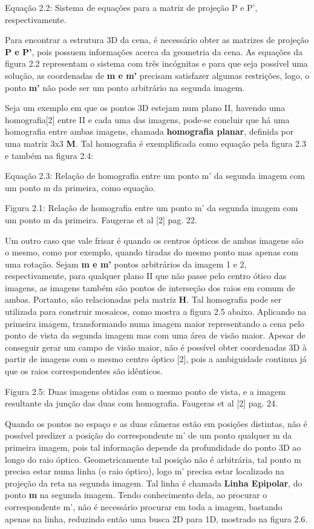 Equação 2.2: Sistema de equações para a matriz de projeção P e P’, respectivamente.

Para encontrar a estrutura 3D da cena, é necessário obter as matrizes de projeção \textbf{P e P’}, pois possuem informações acerca da geometria da cena. As equações da figura 2.2 representam o sistema com três incógnitas e para que seja possível uma solução, as coordenadas de \textbf{m e m’} precisam satisfazer algumas restrições, logo, o ponto \textbf{m’} não pode ser um ponto arbitrário na segunda imagem.

Seja um exemplo em que os pontos 3D estejam num plano II, havendo uma homografia[2] entre II e cada uma das imagens, pode-se concluir que há uma homografia entre ambas imagens, chamada \textbf{homografia planar}, definida por uma matriz 3x3 \textbf{M}. Tal homografia é exemplificada como equação pela figura 2.3 e também na figura 2.4:


Equação 2.3: Relação de homografia entre um ponto m’ da segunda imagem com um ponto m da primeira, como equação.

Figura 2.1: Relação de homografia entre um ponto m’ da segunda imagem com um ponto m da primeira. Faugeras et al [2] pag. 22.

Um outro caso que vale frisar é quando os centros ópticos de ambas imagens são o mesmo, como por exemplo, quando tiradas do mesmo ponto mas apenas com uma rotação. Sejam \textbf{m e m’} pontos arbitrários da imagem 1 e 2, respectivamente, para qualquer plano II que não passe pelo centro ótico das imagens, as imagens também são pontos de interseção dos raios em comum de ambas. Portanto, são relacionadas pela matriz \textbf{H}. Tal homografia pode ser utilizada para construir mosaicos, como mostra a figura 2.5 abaixo. Aplicando na primeira imagem, transformando numa imagem maior representando a cena pelo ponto de vista da segunda imagem mas com uma área de visão maior. Apesar de conseguir gerar um campo de visão maior, não é possível obter coordenadas 3D à partir de imagens com o mesmo centro óptico [2], pois a ambiguidade continua já que os raios correspondentes são idênticos.

Figura 2.5: Duas imagens obtidas com o mesmo ponto de vista, e a imagem resultante da junção das duas com homografia. Faugeras et al [2] pag. 24.

Quando os pontos no espaço e as duas câmeras estão em posições distintas, não é possível predizer a posição do correspondente m’ de um ponto qualquer m da primeira imagem, pois tal informação depende da profundidade do ponto 3D ao longo do raio óptico. Geometricamente tal posição não é arbitrária, tal ponto m precisa estar numa linha (o raio óptico), logo m’ precisa estar localizado na projeção da reta na segunda imagem. Tal linha é chamada \textbf{Linha Epipolar}, do ponto \textbf{m} na segunda imagem. Tendo conhecimento dela, ao procurar o correspondente m’, não é necessário procurar em toda a imagem, bastando apenas na linha, reduzindo então uma busca 2D para 1D, mostrado na figura 2.6.


